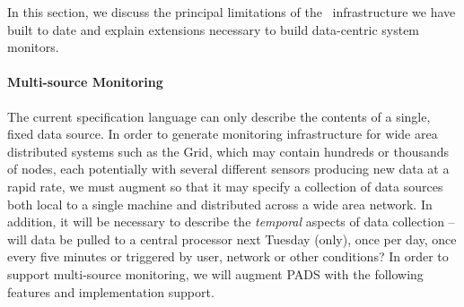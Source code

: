 
In this section, we discuss the principal limitations of the \pads{}\ 
infrastructure we have built to date and explain extensions
necessary to build data-centric system monitors. 

\paragraph*{Multi-source Monitoring}
The current \pads{} specification language can only describe
the contents of a single, fixed data source.  In order to 
generate monitoring infrastructure for
wide area distributed systems such as the Grid, which 
may contain hundreds or thousands of nodes, each 
potentially with several different sensors producing
new data at a rapid rate, we must augment \pads{}
so that it may specify a collection of data sources
both local to a single machine and distributed across a wide area network.
In addition, it will be necessary to describe the {\em temporal}
aspects of data collection -- will data be pulled to a central
processor next Tuesday (only), once per day, once every five minutes
or triggered by user, network or other conditions?
In order to support multi-source monitoring, we will augment PADS
with the following features and implementation support.


